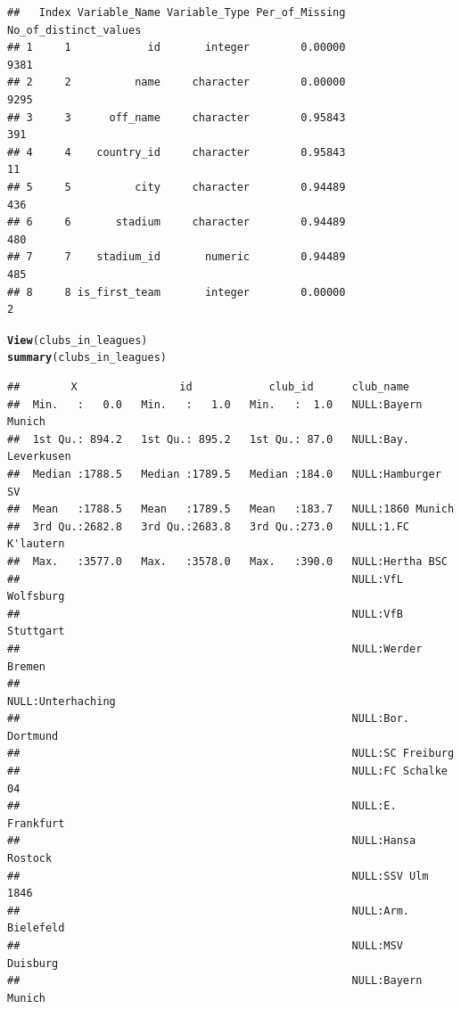 \documentclass{article}\usepackage[]{graphicx}\usepackage[]{color}
\makeatletter
\newcommand{\hlstd}[1]{\textcolor[rgb]{0.345,0.345,0.345}{#1}}%
\newcommand{\hlkwd}[1]{\textcolor[rgb]{0.737,0.353,0.396}{\textbf{#1}}}%
\newenvironment{kframe}{%
 \def\at@end@of@kframe{}%
 \ifinner\ifhmode%
  \def\at@end@of@kframe{\end{minipage}}%
  \begin{minipage}{\columnwidth}%
 \fi\fi%
 \def\FrameCommand##1{\hskip\@totalleftmargin \hskip-\fboxsep
 \colorbox{shadecolor}{##1}\hskip-\fboxsep
     \hskip-\linewidth \hskip-\@totalleftmargin \hskip\columnwidth}%
 \MakeFramed {\advance\hsize-\width
   \@totalleftmargin\z@ \linewidth\hsize
   \@setminipage}}%
 {\par\unskip\endMakeFramed%
 \at@end@of@kframe}
\newenvironment{knitrout}{}{} %
\makeatother
\begin{document}
\begin{knitrout}
\begin{kframe}
\begin{alltt}
\end{alltt}
\begin{verbatim}
##   Index Variable_Name Variable_Type Per_of_Missing No_of_distinct_values
## 1     1            id       integer        0.00000                  9381
## 2     2          name     character        0.00000                  9295
## 3     3      off_name     character        0.95843                   391
## 4     4    country_id     character        0.95843                    11
## 5     5          city     character        0.94489                   436
## 6     6       stadium     character        0.94489                   480
## 7     7    stadium_id       numeric        0.94489                   485
## 8     8 is_first_team       integer        0.00000                     2
\end{verbatim}
\begin{alltt}
\hlkwd{View}\hlstd{(clubs_in_leagues)}
\hlkwd{summary}\hlstd{(clubs_in_leagues)}
\end{alltt}
\begin{verbatim}
##        X                id            club_id      club_name               
##  Min.   :   0.0   Min.   :   1.0   Min.   :  1.0   NULL:Bayern Munich      
##  1st Qu.: 894.2   1st Qu.: 895.2   1st Qu.: 87.0   NULL:Bay. Leverkusen    
##  Median :1788.5   Median :1789.5   Median :184.0   NULL:Hamburger SV       
##  Mean   :1788.5   Mean   :1789.5   Mean   :183.7   NULL:1860 Munich        
##  3rd Qu.:2682.8   3rd Qu.:2683.8   3rd Qu.:273.0   NULL:1.FC K'lautern     
##  Max.   :3577.0   Max.   :3578.0   Max.   :390.0   NULL:Hertha BSC         
##                                                    NULL:VfL Wolfsburg      
##                                                    NULL:VfB Stuttgart      
##                                                    NULL:Werder Bremen      
##                                                    NULL:Unterhaching       
##                                                    NULL:Bor. Dortmund      
##                                                    NULL:SC Freiburg        
##                                                    NULL:FC Schalke 04      
##                                                    NULL:E. Frankfurt       
##                                                    NULL:Hansa Rostock      
##                                                    NULL:SSV Ulm 1846       
##                                                    NULL:Arm. Bielefeld     
##                                                    NULL:MSV Duisburg       
##                                                    NULL:Bayern Munich      

\end{verbatim}
\end{kframe}
\end{knitrout}
\end{document}
